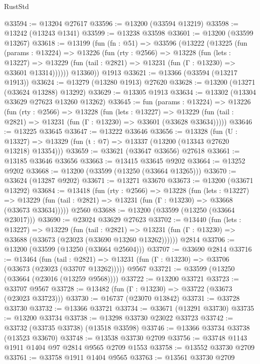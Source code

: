 \begin{lexlean}{RustStd}
\begin{coremodule}
@33594 := @13204 @27617
@33596 := @13200 (@33594 @13219)
@33598 := @13242 (@13243 @1341)
@33599 := @13238 @33598
@33601 := @13200 (@33599 @13267)
@33618 := @13199
    (fun (fn : @51) =>
    @33596
      (@13222
        (@13225
          (fun (params : @13224) =>
          @13226
            (fun (rty : @2566) =>
            @13228
              (fun (lets : @13227) =>
              @13229 (fun (tail : @2821) => @13231 (fun (Γ : @13230) => @33601 @13314))))))
        @13360))
    @1913
@33621 := @13366 (@33594 (@13217 @1913))
@33624 := @13279 (@13280 @1913) @27620
@33628 := @13200 (@13271 (@33624 @13288) @13292)
@33629 := @13305 @1913
@33634 := @13302 (@13304 @33629 @27623 @13260 @13262)
@33645 := fun (params : @13224) =>
  @13226
    (fun (rty : @2566) =>
    @13228
      (fun (lets : @13227) =>
      @13229 (fun (tail : @2821) => @13231 (fun (Γ : @13230) => @33601 (@33628 @33634)))))
@33646 := @13225 @33645
@33647 := @13222 @33646
@33656 := @13328
    (fun (U : @13327) => @13329 (fun (t : @7) => @13337 (@13200 (@13343 @27620 @13218) @13354)))
@33659 := @33621 (@33647 @33656) @27618
@33661 := @13185 @33646 @33656
@33663 := @13415 @33645 @9202
@33664 := @13252 @9202
@33668 := @13200 (@33599 (@13250 (@33664 @13265)))
@33670 := @33624 (@13287 @9202)
@33671 := @13271 @33670
@33673 := @13200 (@33671 @13292)
@33684 := @13418
    (fun (rty : @2566) =>
    @13228
      (fun (lets : @13227) =>
      @13229 (fun (tail : @2821) => @13231 (fun (Γ : @13230) => @33668 (@33673 @33634)))))
    @2560
@33688 := @13200 (@33599 (@13250 (@33664 @23017)))
@33690 := @23024 @33629 @27623
@33702 := @13440
    (fun (lets : @13227) =>
    @13229
      (fun (tail : @2821) =>
      @13231 (fun (Γ : @13230) => @33688 (@33673 (@23023 (@33690 @13260 @13262))))))
    @2814
@33706 := @13200 (@33599 (@13250 (@33664 @25604)))
@33707 := @33690 @2814
@33716 := @13464
    (fun (tail : @2821) => @13231 (fun (Γ : @13230) => @33706 (@33673 (@23023 (@33707 @13262)))))
    @9567
@33721 := @33599 (@13250 (@33664 (@23016 (@13259 @9568))))
@33722 := @13200 @33721
@33723 := @33707 @9567
@33728 := @13482 (fun (Γ : @13230) => @33722 (@33673 (@23023 @33723)))
@33730 := @16737 (@23070 @13842)
@33731 := @33728 @33730
@33732 := @13366 @33721
@33734 := @33671 (@13291 @33730)
@33735 := @13200 @33734
@33738 := @13298 @33730 @23022 @33723
@33742 := @33732 (@33735 @33738) (@13518 @33598)
@33746 := @13366 @33734 @33738 (@13523 @33670)
@33748 := @13538 @33730 @2709
@33756 := @33748 @1143 @1911 @1404 @97 @2814 @9565 @2709 @1553
@33758 := @13552 @33730 @2709
@33761 := @33758 @1911 @1404 @9565
@33763 := @13561 @33730 @2709

\end{coremodule}
\end{lexlean}
